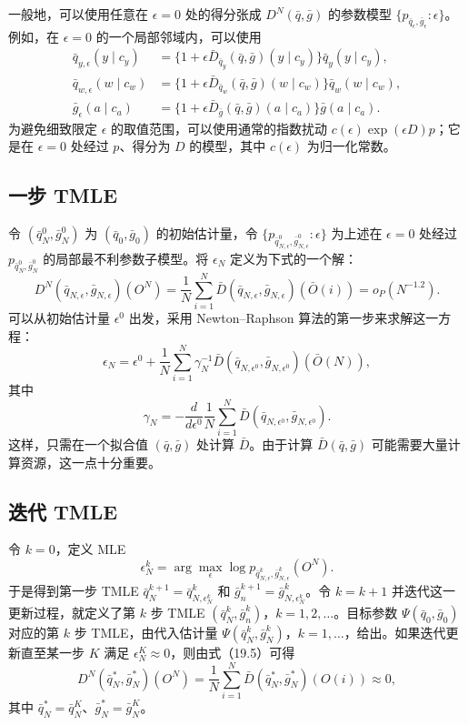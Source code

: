 一般地，可以使用任意在 $\epsilon=0$ 处的得分张成 $D^N(\bar q,\bar g)$ 的参数模型 $\{p_{\bar q_\epsilon,\bar g_\epsilon}:\epsilon\}$。例如，在 $\epsilon=0$ 的一个局部邻域内，可以使用
\[
\begin{aligned}
 \bar q_{y,\epsilon}(y\mid c_y)
 &=\{1+\epsilon\bar D_{\bar q_y}(\bar q,\bar g)(y\mid c_y)\}\bar q_y(y\mid c_y),\\
 \bar q_{w,\epsilon}(w\mid c_w)
 &=\{1+\epsilon\bar D_{\bar q_w}(\bar q,\bar g)(w\mid c_w)\}\bar q_w(w\mid c_w),\\
 \bar g_\epsilon(a\mid c_a)
 &=\{1+\epsilon\bar D_{\bar g}(\bar q,\bar g)(a\mid c_a)\}\bar g(a\mid c_a).
\end{aligned}
\]
为避免细致限定 $\epsilon$ 的取值范围，可以使用通常的指数扰动 $c(\epsilon)\exp(\epsilon D)p$；它是在 $\epsilon=0$ 处经过 $p$、得分为 $D$ 的模型，其中 $c(\epsilon)$ 为归一化常数。

\subsection{一步 TMLE}

令 $(\bar q_N^0,\bar g_N^0)$ 为 $(\bar q_0,\bar g_0)$ 的初始估计量，令 $\{p_{\bar q^0_{N,\epsilon},\bar g^0_{N,\epsilon}}:\epsilon\}$ 为上述在 $\epsilon=0$ 处经过 $p_{\bar q_N^0,\bar g_N^0}$ 的局部最不利参数子模型。将 $\epsilon_N$ 定义为下式的一个解：
\[
 D^N(\bar q_{N,\epsilon},\bar g_{N,\epsilon})(O^N)
 =\frac1N\sum_{i=1}^N\bar D(\bar q_{N,\epsilon},\bar g_{N,\epsilon})(\bar O(i))
 =o_P(N^{-1.2}).
\]
可以从初始估计量 $\epsilon^0$ 出发，采用 Newton--Raphson 算法的第一步来求解这一方程：
\[
 \epsilon_N=\epsilon^0+\frac1N\sum_{i=1}^N
 \gamma_N^{-1}\bar D(\bar q_{N,\epsilon^0},\bar g_{N,\epsilon^0})(\bar O(N)),
\]
其中
\[
 \gamma_N=-\frac d{d\epsilon^0}\frac1N\sum_{i=1}^N
 \bar D(\bar q_{N,\epsilon^0},\bar g_{N,\epsilon^0}).
\]
这样，只需在一个拟合值 $(\bar q,\bar g)$ 处计算 $\bar D$。由于计算 $\bar D(\bar q,\bar g)$ 可能需要大量计算资源，这一点十分重要。

\subsection{迭代 TMLE}

令 $k=0$，定义 MLE
\[
 \epsilon_N^k=\arg\max_\epsilon
 \log p_{\bar q^k_{N,\epsilon},\bar g^k_{N,\epsilon}}(O^N).
\]
于是得到第一步 TMLE $\bar q_N^{k+1}=\bar q^k_{N,\epsilon_N^k}$ 和 $\bar g_n^{k+1}=\bar g^k_{N,\epsilon_N^k}$。令 $k=k+1$ 并迭代这一更新过程，就定义了第 $k$ 步 TMLE $(\bar q_N^k,\bar g_n^k)$，$k=1,2,\ldots$。目标参数 $\Psi(\bar q_0,\bar g_0)$ 对应的第 $k$ 步 TMLE，由代入估计量 $\Psi(\bar q_N^k,\bar g_N^k)$，$k=1,\ldots$，给出。如果迭代更新直至某一步 $K$ 满足 $\epsilon_N^K\approx0$，则由式（19.5）可得
\[
 D^N(\bar q_N^*,\bar g_N^*)(O^N)
 =\frac1N\sum_{i=1}^N\bar D(\bar q_N^*,\bar g_N^*)(O(i))\approx0,
\]
其中 $\bar q_N^*=\bar q_N^K$、$\bar g_N^*=\bar g_N^K$。

